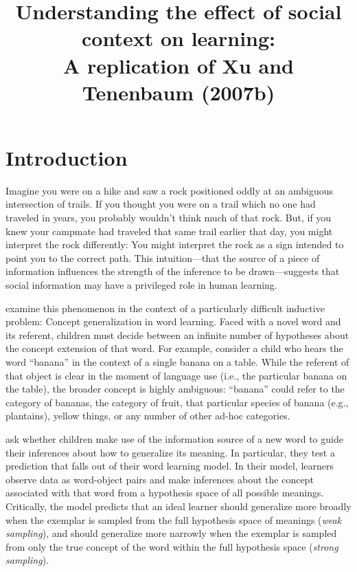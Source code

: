 \documentclass[man]{apa2}
\title{Understanding the effect of social context on learning: \\ A replication of Xu and Tenenbaum (2007b)}
\begin{document}
\maketitle       

\section{Introduction}
Imagine you were on a hike and saw a rock positioned oddly at an ambiguous intersection of trails. If you thought you were on a trail which no one had traveled in years, you probably wouldn't think much of that rock. But, if you knew your campmate had traveled that same trail earlier that day, you might interpret the rock differently: You might interpret the rock as a sign intended to point you to the correct path. This intuition---that the source of a piece of information influences the strength of the inference to be drawn---suggests that social information may have a privileged role in human learning.

 examine this phenomenon in the context of a particularly difficult inductive problem: Concept generalization in word learning. Faced with a novel word and its referent, children must decide between an infinite number of hypotheses about the concept extension of that word. For example, consider a child who hears the word ``banana'' in the context of a single banana on a table. While the referent of that object is clear in the moment of language use (i.e., the particular banana on the table), the broader concept is highly ambiguous: ``banana'' could refer to the category of bananas, the category of fruit, that particular species of banana (e.g., plantains), yellow things, or any number of other ad-hoc categories. 

 ask whether children make use of the information source of a new word to guide their inferences about how to generalize its meaning. In particular, they test a prediction that falls out of their word learning model. In their model, learners observe data as word-object pairs and make inferences about the concept associated with that word from a hypothesis space of all possible meanings. Critically, the model predicts that an ideal learner should generalize more broadly when the exemplar is sampled from the full hypothesis space of meanings ({\it weak sampling}), and should generalize more narrowly when the exemplar is sampled from only the true concept of the word within the full hypothesis space ({\it strong sampling}). 
\end{document}
